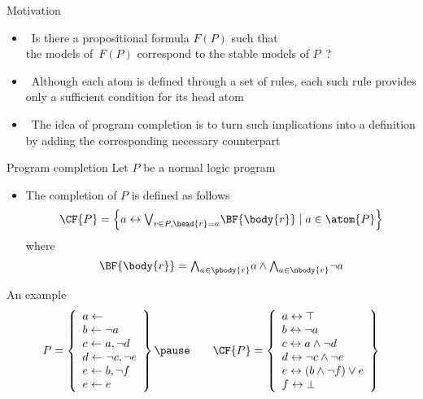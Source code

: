 \begin{frame}{Motivation}
  \bigskip
  \begin{itemize}
  \item<1->  \
    Is there a propositional formula $F(P)$ such that
    \\
    the models of~$F(P)$ correspond to the stable models of $P$~?
    \bigskip
  \item<2->  \
    Although each atom is defined through a set of rules,
    each such rule provides only a \alert{sufficient} condition for its head atom
    \medskip
  \item<3-> \structure{Clark's Idea} \
    The idea of program completion is to turn such implications into a definition
    by adding the corresponding \alert{necessary} counterpart
  \end{itemize}
\end{frame}
\begin{frame}{Program completion}
  \bigskip
  Let $P$ be a normal logic program
  \bigskip
  \begin{itemize}
  \item
    The \alert{completion}  of $P$ is defined as follows
    \[
    \CF{P}
    =
    \left\{a \leftrightarrow \textstyle{\bigvee_{r\in P, \head{r} = a}} \BF{\body{r}} \mid a\in\atom{P}\right\}
    \]
    where
    \[
    \BF{\body{r}}
    =
    \textstyle{\bigwedge_{a\in\pbody{r}}}      a
    \wedge
    \textstyle{\bigwedge_{a\in\nbody{r}}} \neg a
    \]
  \end{itemize}
\end{frame}
\begin{frame}{An example}
\[
P
=
\left\{
  \begin{array}{l}
    a \leftarrow                  \\
    b \leftarrow \neg a          \\
    c \leftarrow a, \neg d       \\
    d \leftarrow \neg c, \neg e \\
    e \leftarrow b, \neg f       \\
    e \leftarrow e
  \end{array}
\right\}
\pause\qquad
\CF{P}
=
\left\{
  \begin{array}{l}
    a \leftrightarrow \top                  \\
    b \leftrightarrow \neg{a}               \\
    c \leftrightarrow a\wedge \neg{d}       \\
    d \leftrightarrow \neg{c}\wedge \neg{e} \\
    e \leftrightarrow (b\wedge \neg{f}) \vee e\\
    f \leftrightarrow \bot
  \end{array}
\right\}
\]
\end{frame}
